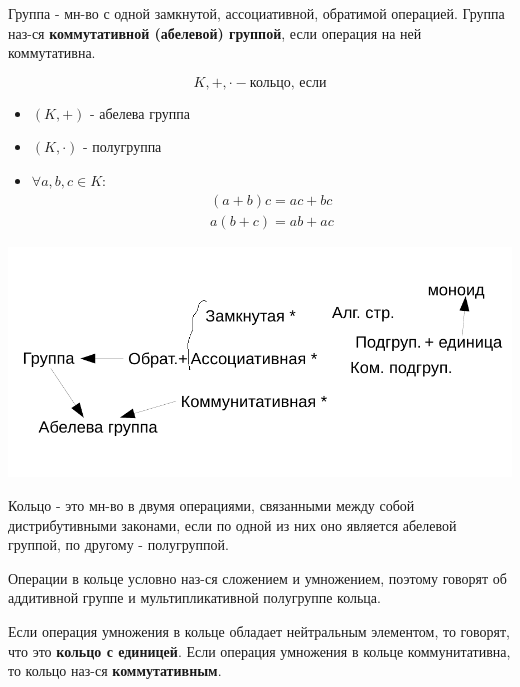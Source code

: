 \begin{definition}
	Группа - мн-во с одной замкнутой, ассоциативной, обратимой операцией. Группа наз-ся \textbf{коммутативной (абелевой) группой}, если операция на ней коммутативна.
\end{definition}

\[ K, +, \cdot - \text{кольцо, если} \]

\begin{itemize}
	\item $(K, +)$ - абелева группа
	\item $(K, \cdot)$ - полугруппа
	\item $\forall a, b, c \in K:$
	\[
	\begin{aligned}
		(a+b)c = ac + bc \\
		a(b+c) = ab + ac
	\end{aligned}
	\]
\end{itemize}

\includegraphics[]{./media/sv_group.pdf}

\begin{definition}[Кольцо]
	Кольцо - это мн-во в двумя операциями, связанными между собой дистрибутивными законами, если по одной из них оно является абелевой группой, по другому - полугруппой.
\end{definition}

\begin{remark}
	Операции в кольце условно наз-ся сложением и умножением, поэтому говорят об аддитивной группе и мультипликативной полугруппе кольца.
\end{remark}

\begin{remark}
	Если операция умножения в кольце обладает нейтральным элементом, то говорят, что это \textbf{кольцо с единицей}. Если операция умножения в кольце коммунитативна, то кольцо наз-ся \textbf{коммутативным}. 
\end{remark}


